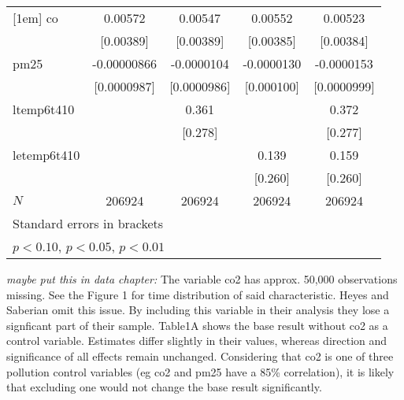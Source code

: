 \documentclass[11pt]{article}
\begin{document}
\begin{center}
{\begin{tabular}{l*{4}{c}}
				[1em]
				co          &     0.00572         &     0.00547         &     0.00552         &     0.00523         \\
				&   [0.00389]         &   [0.00389]         &   [0.00385]         &   [0.00384]         \\
				[1em]
				pm25        & -0.00000866         &  -0.0000104         &  -0.0000130         &  -0.0000153         \\
				& [0.0000987]         & [0.0000986]         &  [0.000100]         & [0.0000999]         \\
				[1em]
				ltemp6t410  &                     &       0.361         &                     &       0.372         \\
				&                     &     [0.278]         &                     &     [0.277]         \\
				[1em]
				letemp6t410 &                     &                     &       0.139         &       0.159         \\
				&                     &                     &     [0.260]         &     [0.260]         \\
				\hline
				\(N\)       &      206924         &      206924         &      206924         &      206924         \\
				\hline\hline
				\multicolumn{5}{l}{\footnotesize Standard errors in brackets}\\
				\multicolumn{5}{l}{\footnotesize \sym{*} \(p<0.10\), \sym{**} \(p<0.05\), \sym{***} \(p<0.01\)}\\
			\end{tabular}
		}
	\end{center}
	
	\textit{maybe put this in data chapter:} The variable co2 has approx. 50,000 observations missing. See the Figure 1 for time distribution of said characteristic. Heyes and Saberian omit this issue. By including this variable in their analysis they lose a signficant part of their sample. Table1A shows the base result without co2 as a control variable. Estimates differ slightly in their values, whereas direction and significance of all effects remain unchanged. Considering that co2 is one of three pollution control variables (eg co2 and pm25 have a 85\% correlation), it is likely that excluding one would not change the base result significantly. 
	
\end{document}
